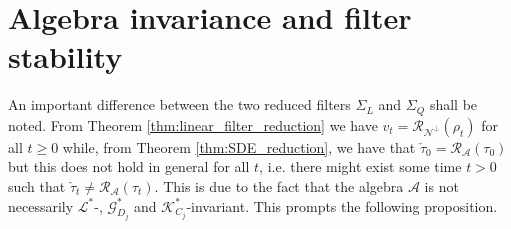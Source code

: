 \documentclass[aihp,12pt]{imsart}
\newcommand{\Gc}{\mathcal{G}}
\newcommand{\Rc}{\mathcal{R}}
\newcommand{\Kc}{\mathcal{K}}
\newcommand{\Lc}{\mathcal{L}}
\newcommand{\As}{\mathscr{A}}
\newcommand{\Ns}{\mathscr{N}}
\theoremstyle{theorem}
\theoremstyle{definition}
\theoremstyle{remark}
\begin{document}
\section{Algebra invariance and filter stability}

An important difference between the two reduced filters $\Sigma_L$ and $\Sigma_Q$ shall be noted. From Theorem \ref{thm:linear_filter_reduction} we have $v_t = \Rc_{\Ns^\perp}(\rho_t)$ for all $t\geq0$ while, from Theorem \ref{thm:SDE_reduction}, we have that $\check{\tau}_0 = \Rc_{\As}(\tau_0)$ but this does not hold in general for all $t$, i.e. there might exist some time $t>0$ such that $\check{\tau}_t \neq \Rc_{\As}(\tau_t)$. This is due to the fact that the algebra $\As$ is not necessarily $\Lc^*$-, $\Gc_{D_j}^*$ and $\Kc_{C_j}^*$-invariant. This prompts the following proposition.
\end{document}
